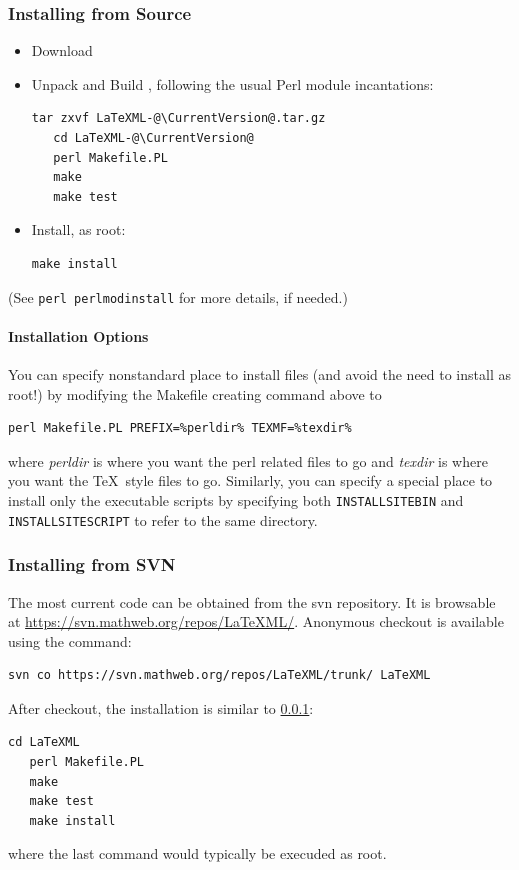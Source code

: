 \documentclass{article}
\begin{document}
\subsubsection{Installing from Source}\label{install.source}
\begin{itemize}
\item Download \CurrentTarball
\item Unpack and Build \LaTeXML, following the usual Perl module incantations:
\begin{lstlisting}[style=shell]
   tar zxvf LaTeXML-@\CurrentVersion@.tar.gz
   cd LaTeXML-@\CurrentVersion@
   perl Makefile.PL
   make
   make test
\end{lstlisting}
\item Install, as root:
\begin{lstlisting}[style=shell]
   make install
\end{lstlisting}
\end{itemize}
(See \texttt{perl perlmodinstall} for more details, if needed.)

\paragraph{Installation Options}\label{install.options}
You can specify nonstandard place to install files (and avoid the need to install as root!)
by modifying the Makefile creating command above to
\begin{lstlisting}[style=shell]
   perl Makefile.PL PREFIX=%perldir% TEXMF=%texdir%
\end{lstlisting}
where \emph{perldir} is where you want the perl related files to go and
\emph{texdir} is where you want the \TeX\ style files to go.
Similarly, you can specify a special place to install only the
executable scripts by specifying both \texttt{INSTALLSITEBIN} and \texttt{INSTALLSITESCRIPT}
to refer to the same directory.

\subsubsection{Installing from SVN}\label{install.svn}
The most current code can be obtained from the svn repository.
It is browsable at \url{https://svn.mathweb.org/repos/LaTeXML/}.
Anonymous checkout is available using the command:
\begin{lstlisting}[style=shell]
  svn co https://svn.mathweb.org/repos/LaTeXML/trunk/ LaTeXML
\end{lstlisting}
After checkout, the installation is similar to \ref{install.source}:
\begin{lstlisting}[style=shell]
   cd LaTeXML
   perl Makefile.PL
   make
   make test
   make install
\end{lstlisting}
where the last command would typically be execuded as root.
\end{document}
